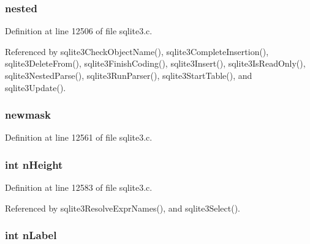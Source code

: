 \hypertarget{struct_parse_a64c4a569459a2f34e4a43d42d7a2394c}{}
\subsubsection[{nested}]{ nested}\label{struct_parse_a64c4a569459a2f34e4a43d42d7a2394c}


Definition at line 12506 of file sqlite3.\+c.



Referenced by sqlite3\+Check\+Object\+Name(), sqlite3\+Complete\+Insertion(), sqlite3\+Delete\+From(), sqlite3\+Finish\+Coding(), sqlite3\+Insert(), sqlite3\+Is\+Read\+Only(), sqlite3\+Nested\+Parse(), sqlite3\+Run\+Parser(), sqlite3\+Start\+Table(), and sqlite3\+Update().

\hypertarget{struct_parse_aa36ace4eeccdcabc2a3295de12277fb9}{}
\subsubsection[{newmask}]{ newmask}\label{struct_parse_aa36ace4eeccdcabc2a3295de12277fb9}


Definition at line 12561 of file sqlite3.\+c.

\hypertarget{struct_parse_a17d981419afeee27eb36a8b43183e49a}{}
\subsubsection[{n\+Height}]{\setlength{\rightskip}{0pt plus 5cm}int n\+Height}\label{struct_parse_a17d981419afeee27eb36a8b43183e49a}


Definition at line 12583 of file sqlite3.\+c.



Referenced by sqlite3\+Resolve\+Expr\+Names(), and sqlite3\+Select().

\hypertarget{struct_parse_af5a14ba3fa9c2cb9827402a81a53a986}{}
\subsubsection[{n\+Label}]{\setlength{\rightskip}{0pt plus 5cm}int n\+Label}\label{struct_parse_af5a14ba3fa9c2cb9827402a81a53a986}


